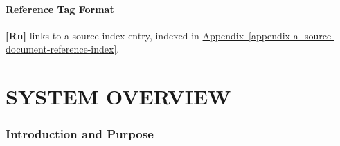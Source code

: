 \subsection*{Reference Tag Format}\label{reference-tag-format}

\textbf{[Rn]} links to a source-index entry, indexed in \hyperref[appendix-a--source-document-reference-index]{Appendix~\ref*{appendix-a--source-document-reference-index}}. 

\FloatBarrier\clearpage
\part{SYSTEM OVERVIEW}


\section{Introduction and Purpose}

